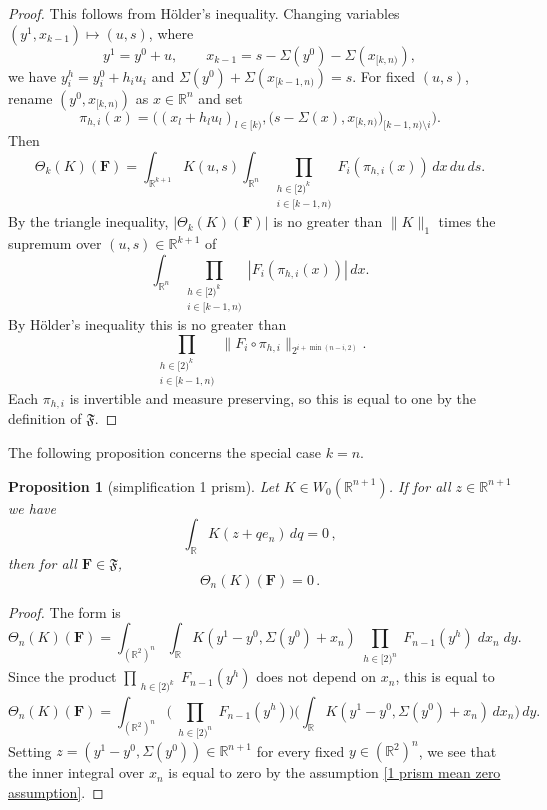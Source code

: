 \documentclass[12pt,reqno]{amsart}
\theoremstyle{plain}
\newtheorem{proposition}[theorem]{Proposition}
\numberwithin{equation}{section}
\theoremstyle{remark}
\newcommand{\R}{{\mathbb R}}
\newcommand{\F}{\mathbf{F}}
\begin{document}
\begin{proof}
This follows from H\"older's inequality.
Changing variables $(y^1,x_{k-1})\mapsto (u,s)$, where
\[
y^1=y^0+u,\qquad x_{k-1}=s-\Sigma(y^0)-\Sigma(x_{[k,n)}),
\]
we have $y_i^h=y_i^0+h_iu_i$ and
$\Sigma(y^0)+\Sigma(x_{[k-1,n)})=s$. For fixed $(u,s)$, rename
$(y^0,x_{[k,n)})$ as $x\in\R^n$ and set
\[
\pi_{h,i}(x)
=
\Big((x_l+h_lu_l)_{l\in [k)},
\big(s-\Sigma(x),x_{[k,n)}\big)_{[k-1,n)\setminus i}\Big).
\]
Then
\[
\Theta_k(K)(\F)
=
\int_{\R^{k+1}} K(u,s)
\int_{\R^n}
\prod_{\substack{h\in [2)^k\\ i\in [k-1,n)}}
F_i(\pi_{h,i}(x))
\,dx\,du\,ds.
\]
By the triangle inequality, $|\Theta_k(K)(\F)|$ is no greater than $\|K\|_1$ times the supremum over $(u,s)\in\R^{k+1}$ of
\[
\int_{\R^n}
\prod_{\substack{h\in [2)^k\\ i\in [k-1,n)}}
|F_i(\pi_{h,i}(x))|
\,dx.
\]
By H\"older's inequality this is no greater than
\[
\prod_{\substack{h\in [2)^k\\ i\in [k-1,n)}}
\|F_i\circ\pi_{h,i}\|_{2^{i+\min(n-i,2)}}.
\]
Each $\pi_{h,i}$ is invertible and measure preserving, so this is equal to one by the definition of $\mathfrak{F}$.
\end{proof}

The following proposition concerns the special case $k=n$.
\begin{proposition}[simplification 1 prism]\label{simplification 1 prism}
    Let $K\in W_0(\R^{n+1})$. If for all $z\in \R^{n+1}$ we have
    \begin{equation}\label{1 prism mean zero assumption}
        \int_\R K(z+qe_n)\, dq=0\, ,
    \end{equation}
    then for all $\F\in \mathfrak{F}$,
    \begin{equation}\label{auto:terminal-K-form-zero}
         \Theta_n(K)(\F)= 0\, .
    \end{equation}
\end{proposition}
\begin{proof}
The form is
\[ \Theta_{n}(K)(\F) = \int_{(\R^{2})^n} \int_{\R} K(y^1-y^0, \Sigma(y^0) + x_n)
\prod_{\substack{h\in [2)^n}} F_{n-1}( y^h)\;dx_n\;dy. \]
Since the product $\prod_{\substack{h\in [2)^k}} F_{n-1}( y^h)$ does not depend on $x_n$, this is equal to
\[\Theta_n(K)(\F) = \int_{(\R^{2})^n} \Big( \prod_{\substack{h\in [2)^n}} F_{n-1}( y^h) \Big) \Big(\int_{\R} K(y^1-y^0, \Sigma(y^0) + x_n)\,dx_n\Big)\,dy. \]
Setting $z=(y^1-y^0, \Sigma(y^0))\in\R^{n+1}$ for every fixed $y\in (\R^2)^n$, we see that the inner integral over $x_n$ is equal to zero by the assumption \eqref{1 prism mean zero assumption}.
\end{proof}
\end{document}
